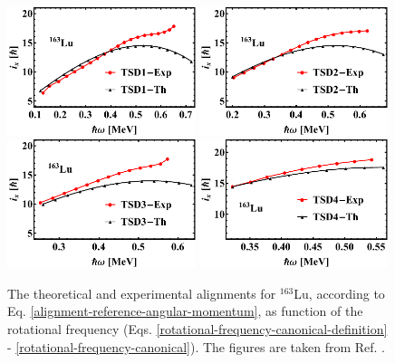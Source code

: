 \begin{figure}
    \centering
    \includegraphics[width=0.49\textwidth]{Chapters/Figures/Lu-exp-energies/fig8a_lu163.pdf}
    \includegraphics[width=0.49\textwidth]{Chapters/Figures/Lu-exp-energies/fig8b_lu163.pdf}
    \includegraphics[width=0.49\textwidth]{Chapters/Figures/Lu-exp-energies/fig8c_lu163.pdf}
    \includegraphics[width=0.49\textwidth]{Chapters/Figures/Lu-exp-energies/fig8d_lu163.pdf}
    \caption{The theoretical and experimental alignments for $^{163}$Lu, according to Eq. \ref{alignment-reference-angular-momentum}, as function of the rotational frequency (Eqs. \ref{rotational-frequency-canonical-definition} - \ref{rotational-frequency-canonical}). The figures are taken from Ref. \cite{raduta2020approach}.}
    \label{alignments-lu-163}
\end{figure}

